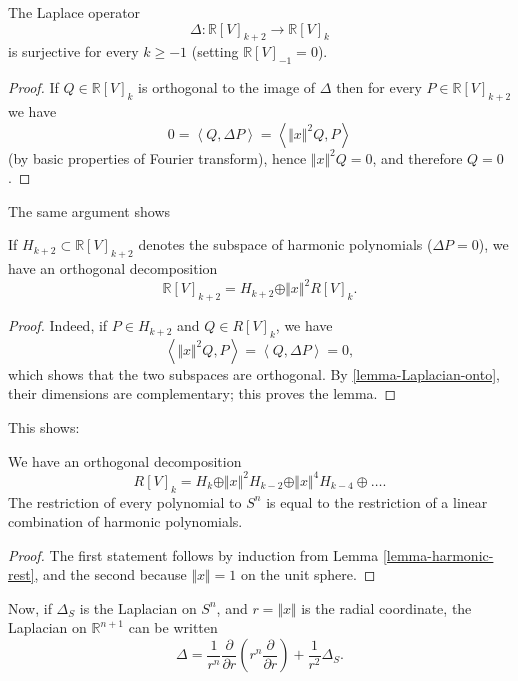 \begin{lemma}
 \label{lemma-Laplacian-onto}
The Laplace operator
$$ \Delta:\mathbb R[V]_{k+2}  \to \mathbb R[V]_k$$
is surjective for every $k\ge -1$ (setting $\mathbb R[V]_{-1} =0$).  
\end{lemma}

\begin{proof}
 If $Q\in \mathbb R[V]_k$ is orthogonal to the image of $\Delta$ then for every $P\in \mathbb R[V]_{k+2}$ we have
 $$ 0 = \left < Q, \Delta P \right> = \left< \Vert x\Vert^2 Q, P\right>$$
 (by basic properties of Fourier transform),
 hence $\Vert x \Vert^2 Q = 0$, and therefore $Q=0$.
\end{proof} 
 
The same argument shows
\begin{lemma}
 \label{lemma-harmonic-rest}
If $H_{k+2} \subset \mathbb R[V]_{k+2}$ denotes the subspace of harmonic polynomials ($\Delta P=0$), we have an orthogonal decomposition
$$\mathbb R[V]_{k+2} = H_{k+2} \oplus \Vert x\Vert^2 R[V]_k.$$
\end{lemma}

\begin{proof}
 Indeed, if $P \in H_{k+2}$ and $Q\in R[V]_k$, we have 
 $$\left< \Vert x\Vert^2 Q, P\right> =\left < Q, \Delta P \right> =0,$$ 
 which shows that the two subspaces are orthogonal. By \ref{lemma-Laplacian-onto}, their dimensions are complementary; this proves the lemma.
\end{proof}

This shows:
\begin{proposition}
 \label{proposition-harmonic-ontosphere}
 We have an orthogonal decomposition
 $$ R[V]_k = H_k \oplus \Vert x\Vert^2 H_{k-2} \oplus \Vert x\Vert^4 H_{k-4} \oplus \dots.$$
 The restriction of every polynomial to $S^n$ is equal to the restriction of a linear combination of harmonic polynomials.
\end{proposition}

\begin{proof}
 The first statement follows by induction from Lemma \ref{lemma-harmonic-rest}, and the second because $\Vert x\Vert =1$ on the unit sphere.
\end{proof}

Now, if $\Delta_S$ is the Laplacian on $S^n$, and $r = \Vert x\Vert$ is the radial coordinate, the Laplacian on $\mathbb R^{n+1}$ can be written
\begin{equation}
 \label{equation-Laplacian-decomposition}
 \Delta = \frac{1}{r^n} \frac{\partial}{\partial r} \left(r^n \frac{\partial}{\partial r}\right) + \frac{1}{r^2} \Delta_S.
\end{equation}

